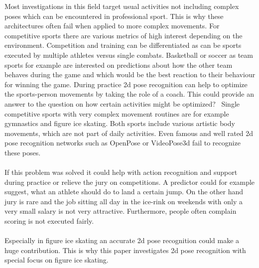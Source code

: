 Most investigations in this field target usual activities not including complex poses which can be encountered in
professional sport.
This is why these architectures often fail when applied to more complex movements.
For competitive sports there are various metrics of high interest depending on the environment.
Competition and training can be differentiated as can be sports executed by multiple athletes versus single combats.
Basketball or soccer as team sports for example are interested on predictions about
how the other team behaves during the game and which would be the best reaction to their behaviour for winning
the game.
During practice 2d pose recognition can help to optimize the sports-person movements by taking the role of a coach.
This could provide an answer to the question on how certain activities might be optimized? \
Single competitive sports with very complex movement routines are for example gymnastics and figure ice skating.
Both sports include various artistic body movements, which are not part of daily activities.
Even famous and well rated 2d pose recognition networks such as OpenPose or VideoPose3d fail to recognize these
poses.
\\\mbox{}\\
If this problem was solved it could help with action recognition and support during practice or relieve the jury
on competitions.
A predictor could for example suggest, what an athlete should do to land a certain jump.
On the other hand jury is rare and the job sitting all day in the ice-rink on weekends with only a very small
salary is not very attractive.
Furthermore, people often complain scoring is not executed fairly.
\\\mbox{}\\
Especially in figure ice skating an accurate 2d pose recognition could make a huge contribution.
This is why this paper investigates 2d pose recognition with special focus on figure ice skating.
%




%
%



